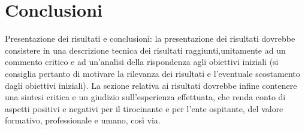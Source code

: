 \chapter{Conclusioni}
\label{chp:05-conclusion}


Presentazione dei risultati e conclusioni: la presentazione dei risultati dovrebbe consistere in una 
descrizione tecnica dei risultati raggiunti,unitamente ad un commento critico e ad un’analisi della rispondenza agli 
obiettivi iniziali (si consiglia pertanto di motivare 
la rilevanza dei risultati e l’eventuale scostamento dagli obiettivi iniziali). La sezione relativa ai risultati dovrebbe 
infine contenere una sintesi critica e un giudizio sull’esperienza effettuata, che renda conto di aspetti positivi e negativi
per il tirocinante e per l’ente ospitante, del valore formativo, professionale e umano, così via.